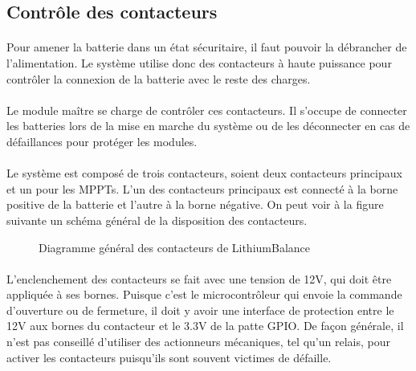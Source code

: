 
\subsection{Contrôle des contacteurs}

	\paragraph*{}
	Pour amener la batterie dans un état sécuritaire, il faut pouvoir la débrancher de l'alimentation. Le système utilise donc des contacteurs à haute puissance pour contrôler la connexion de la batterie avec le reste des charges. 
	
	\paragraph*{}
	Le module maître se charge de contrôler ces contacteurs. Il s'occupe de connecter les batteries lors de la mise en marche du système ou de les déconnecter en cas de défaillances pour protéger les modules.

	\paragraph*{}
	Le système est composé de trois contacteurs, soient deux contacteurs principaux et un pour les MPPTs. L'un des contacteurs principaux est connecté à la borne positive de la batterie et l'autre à la borne négative. On peut voir à la figure suivante un schéma général de la disposition des contacteurs. 
	
	\begin{figure}[H]
		\centering
		\caption{Diagramme général des contacteurs de LithiumBalance \cite{Lithium_Balance}}
		\label{fig:lithiumbalancecontactordiagram}
	\end{figure}

	\paragraph*{}
	L'enclenchement des contacteurs se fait avec une tension de 12V, qui doit être appliquée à ses bornes. Puisque c'est le microcontrôleur qui envoie la commande d'ouverture ou de fermeture, il doit y avoir une interface de protection entre le 12V aux bornes du contacteur et le 3.3V de la patte GPIO. De façon générale, il n'est pas conseillé d'utiliser des actionneurs mécaniques, tel qu'un relais, pour activer les contacteurs puisqu'ils sont souvent victimes de défaille. 	 

